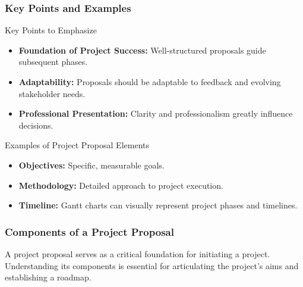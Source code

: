 \documentclass[aspectratio=169]{beamer}
\begin{document}
\begin{frame}[fragile]
    \frametitle{Key Points and Examples}
    \begin{block}{Key Points to Emphasize}
        \begin{itemize}
            \item \textbf{Foundation of Project Success:} Well-structured proposals guide subsequent phases.
            \item \textbf{Adaptability:} Proposals should be adaptable to feedback and evolving stakeholder needs.
            \item \textbf{Professional Presentation:} Clarity and professionalism greatly influence decisions.
        \end{itemize} 
    \end{block}

    \begin{block}{Examples of Project Proposal Elements}
        \begin{itemize}
            \item \textbf{Objectives:} Specific, measurable goals.
            \item \textbf{Methodology:} Detailed approach to project execution.
            \item \textbf{Timeline:} Gantt charts can visually represent project phases and timelines.
        \end{itemize} 
    \end{block}
\end{frame}

\begin{frame}[fragile]
    \frametitle{Components of a Project Proposal}
    A project proposal serves as a critical foundation for initiating a project. Understanding its components is essential for articulating the project's aims and establishing a roadmap. 
\end{frame}
\end{document}

